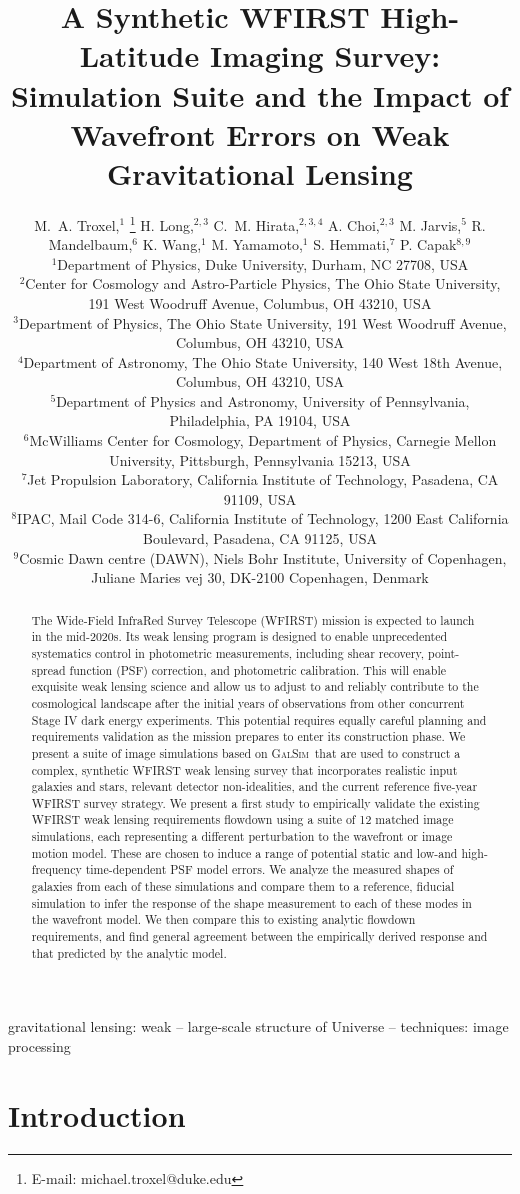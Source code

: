 \documentclass[usenatbib]{mnras}
\title[A Synthetic WFIRST High-Latitude Imaging Survey]{A Synthetic WFIRST High-Latitude Imaging Survey: 
Simulation Suite and the Impact of Wavefront Errors on Weak Gravitational Lensing}
\author[M.~A. Troxel et al.]{M.~A. Troxel,$^1$ \thanks{E-mail: michael.troxel@duke.edu}
H. Long,$^{2,3}$
C.~M. Hirata,$^{2,3,4}$
A. Choi,$^{2,3}$
M. Jarvis,$^5$
R. Mandelbaum,$^6$
\newauthor
K. Wang,$^1$
M. Yamamoto,$^1$
S. Hemmati,$^7$
P. Capak$^{8,9}$\\
$^{1}$Department of Physics, Duke University, Durham, NC 27708, USA\\
$^{2}$Center for Cosmology and Astro-Particle Physics, The Ohio State University, 191 West Woodruff Avenue, Columbus, OH 43210, USA\\
$^{3}$Department of Physics, The Ohio State University, 191 West Woodruff Avenue, Columbus, OH 43210, USA\\
$^{4}$Department of Astronomy, The Ohio State University, 140 West 18th Avenue, Columbus, OH 43210, USA\\
$^{5}$Department of Physics and Astronomy, University of Pennsylvania, Philadelphia, PA 19104, USA\\
$^{6}$McWilliams Center for Cosmology, Department of Physics, Carnegie Mellon University, Pittsburgh, Pennsylvania 15213, USA\\
$^{7}$Jet Propulsion Laboratory, California Institute of Technology, Pasadena, CA 91109, USA\\
$^{8}$IPAC, Mail Code 314-6, California Institute of Technology, 1200 East California Boulevard, Pasadena, CA 91125, USA\\
$^{9}$Cosmic Dawn centre (DAWN), Niels Bohr Institute, University of Copenhagen, Juliane Maries vej 30, DK-2100 Copenhagen, Denmark
}
\newcommand{\galsim}{\textsc{GalSim}}
\begin{document}
\label{firstpage}
\pagerange{\pageref{firstpage}--\pageref{lastpage}}
\maketitle

\begin{abstract}
The Wide-Field InfraRed Survey Telescope (WFIRST) mission is expected to launch in the mid-2020s. Its weak lensing program is designed to enable unprecedented systematics control in photometric measurements, including shear recovery, point-spread function (PSF) correction, and photometric calibration. This will enable exquisite weak lensing science and allow us to adjust to and reliably contribute to the cosmological landscape after the initial years of observations from other concurrent Stage IV dark energy experiments. This potential requires equally careful planning and requirements validation as the mission prepares to enter its construction phase. We present a suite of image simulations based on \galsim\ that are used to construct a complex, synthetic WFIRST weak lensing survey that incorporates realistic input galaxies and stars, relevant detector non-idealities, and the current reference five-year WFIRST survey strategy. We present a first study to empirically validate the existing WFIRST weak lensing requirements flowdown using a suite of 12 matched image simulations, each representing a different perturbation to the wavefront or image motion model. These are chosen to induce a range of potential static and low-and high-frequency time-dependent PSF model errors. We analyze the measured shapes of galaxies from each of these simulations and compare them to a reference, fiducial simulation to infer the response of the shape measurement to each of these modes in the wavefront model. We then compare this to existing analytic flowdown requirements, and find general agreement between the empirically derived response and that predicted by the analytic model.
\end{abstract}

\begin{keywords}
gravitational lensing: weak -- large-scale structure of Universe -- techniques: image processing
\end{keywords}

\maketitle


\section{Introduction}\label{sec:intro}
\end{document}
